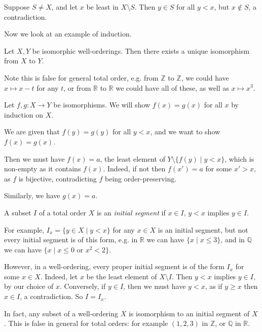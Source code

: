 \documentclass[12pt]{article}
\begin{document}
\begin{proofbox}
	Suppose $S \neq X$, and let $x$ be least in $X \setminus S$. Then $y \in S$ for all $y < x$, but $x \not \in S$, a contradiction.
\end{proofbox}

Now we look at an example of induction.

\begin{proposition}
	Let $X, Y$ be isomorphic well-orderings. Then there exists a unique isomorphism from $X$ to $Y$.
\end{proposition}

Note this is false for general total order, e.g. from $\mathbb{Z}$ to $\mathbb{Z}$, we could have $x \mapsto x - t$ for any $t$, or from $\mathbb{R}$ to $\mathbb{R}$ we could have all of these, as well as $x \mapsto x^3$.

\begin{proofbox}
	Let $f, g : X \to Y$ be isomorphisms. We will show $f(x) = g(x)$ for all $x$ by induction on $X$.

	We are given that $f(y) = g(y)$ for all $y < x$, and we want to show $f(x) = g(x)$.

	Then we must have $f(x) = a$, the least element of $Y \setminus \{f(y) \mid y < x\}$, which is non-empty as it contains $f(x)$. Indeed, if not then $f(x') = a$ for some $x' > x$, as $f$ is bijective, contradicting $f$ being order-preserving.

	Similarly, we have $g(x) = a$.
\end{proofbox}

A subset $I$ of a total order $X$ is an \emph{initial segment} if $x \in I$, $y < x$ implies $y \in I$.

For example, $I_x = \{y \in X \mid y < x\}$ for any $x \in X$ is an initial segment, but not every initial segment is of this form, e.g. in $\mathbb{R}$ we can have $\{x \mid x \leq 3\}$, and in $\mathbb{Q}$ we can have $\{x \mid x \leq 0 \text{ or } x^2 < 2\}$.

However, in a well-ordering, every proper initial segment is of the form $I_x$ for some $x \in X$. Indeed, let $x$ be the least element of $X \setminus I$. Then $y < x$ implies $y \in I$, by our choice of $x$. Conversely, if $y \in I$, then we must have $y < x$, as if $y \geq x$ then $x \in I$, a contradiction. So $I = I_x$.

In fact, any subset of a well-ordering $X$ is isomorphism to an initial segment of $X$. This is false in general for total orders: for example $(1, 2, 3)$ in $\mathbb{Z}$, or $\mathbb{Q}$ in $\mathbb{R}$.
\end{document}
